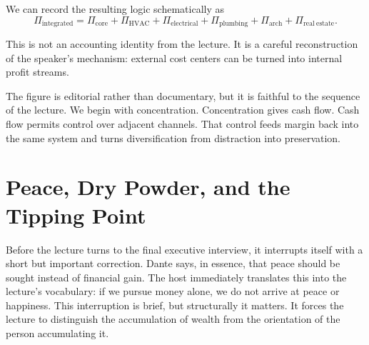 We can record the resulting logic schematically as
\begin{equation}
\Pi_{\mathrm{integrated}}
=
\Pi_{\mathrm{core}}
+
\Pi_{\mathrm{HVAC}}
+
\Pi_{\mathrm{electrical}}
+
\Pi_{\mathrm{plumbing}}
+
\Pi_{\mathrm{arch}}
+
\Pi_{\mathrm{real\ estate}}.
\end{equation}

This is not an accounting identity from the lecture. It is a careful reconstruction of the speaker's mechanism: external cost centers can be turned into internal profit streams.

\begin{figure}
\centering
{}
\end{figure}

The figure is editorial rather than documentary, but it is faithful to the sequence of the lecture. We begin with concentration. Concentration gives cash flow. Cash flow permits control over adjacent channels. That control feeds margin back into the same system and turns diversification from distraction into preservation.

\section{Peace, Dry Powder, and the Tipping Point}

Before the lecture turns to the final executive interview, it interrupts itself with a short but important correction. Dante says, in essence, that peace should be sought instead of financial gain. The host immediately translates this into the lecture's vocabulary: if we pursue money alone, we do not arrive at peace or happiness. This interruption is brief, but structurally it matters. It forces the lecture to distinguish the accumulation of wealth from the orientation of the person accumulating it.

